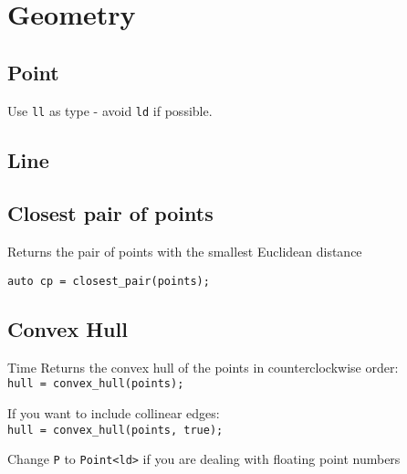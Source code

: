 \section{Geometry}

\subsection{Point}
Use \verb|ll| as type - avoid \verb|ld| if possible.



\subsection{Line}



\subsection{Closest pair of points}

Returns the pair of points with the smallest Euclidean distance

\verb|auto cp = closest_pair(points);|



\subsection{Convex Hull}
 Time
Returns the convex hull of the points in counterclockwise order: \\
\verb|hull = convex_hull(points);|

If you want to include collinear edges: \\
\verb|hull = convex_hull(points, true);|

Change \verb|P| to \verb|Point<ld>| if you are dealing with floating point numbers

